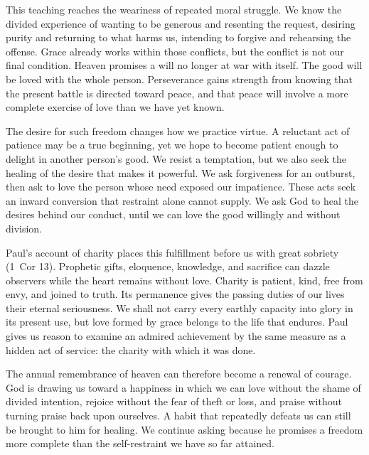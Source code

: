 This teaching reaches the weariness of repeated moral struggle. We know the divided experience of wanting to be generous and resenting the request, desiring purity and returning to what harms us, intending to forgive and rehearsing the offense. Grace already works within those conflicts, but the conflict is not our final condition. Heaven promises a will no longer at war with itself. The good will be loved with the whole person. Perseverance gains strength from knowing that the present battle is directed toward peace, and that peace will involve a more complete exercise of love than we have yet known.

The desire for such freedom changes how we practice virtue. A reluctant act of patience may be a true beginning, yet we hope to become patient enough to delight in another person's good. We resist a temptation, but we also seek the healing of the desire that makes it powerful. We ask forgiveness for an outburst, then ask to love the person whose need exposed our impatience. These acts seek an inward conversion that restraint alone cannot supply. We ask God to heal the desires behind our conduct, until we can love the good willingly and without division.

Paul's account of charity places this fulfillment before us with great sobriety (1~Cor 13). Prophetic gifts, eloquence, knowledge, and sacrifice can dazzle observers while the heart remains without love. Charity is patient, kind, free from envy, and joined to truth. Its permanence gives the passing duties of our lives their eternal seriousness. We shall not carry every earthly capacity into glory in its present use, but love formed by grace belongs to the life that endures. Paul gives us reason to examine an admired achievement by the same measure as a hidden act of service: the charity with which it was done.

The annual remembrance of heaven can therefore become a renewal of courage. God is drawing us toward a happiness in which we can love without the shame of divided intention, rejoice without the fear of theft or loss, and praise without turning praise back upon ourselves. A habit that repeatedly defeats us can still be brought to him for healing. We continue asking because he promises a freedom more complete than the self-restraint we have so far attained.

